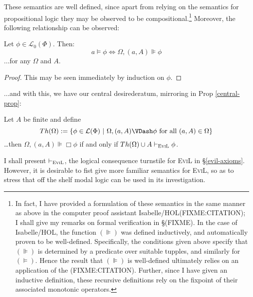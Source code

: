 These semantics are well defined, since apart from relying on the semantics
for propositional logic they may be observed to be compositional.{\footnote{In
fact, I have provided a formulation of these semantics in the same manner as
above in the computer proof assistant Isabelle/HOL(FIXME:CITATION); I shall
give my remarks on formal verification in \S(FIXME).  In the case of
Isabelle/HOL, the function $(\VDash)$ was defined inductively, and
automatically proven to be well-defined.  Specifically, the conditions given
above specify that $(\VDash)$ is determined by a 
predicate over suitable tupples, and similarly for $(\models)$.  Hence the
result that $(\VDash)$ is well-defined ultimately relies on an application of
the  (FIXME:CITATION). Further,
since I have given an inductive definition, these recursive definitions rely
on the {} fixpoint of their associated monotonic operators.}} 
Moreover, the following relationship can be observed:

\begin{lemma}
  Let $\phi \in \mathcal{L}_0 (\Phi)$.  Then:
  \[ a \models \phi \Longleftrightarrow \Omega, (a, A) \VDash \phi \]
  $\ldots$for any $\Omega$ and $A$.
\end{lemma}

\begin{proof}
  This may be seen immediately by induction on $\phi$.
\end{proof}

$\ldots$and with this, we have our central desirederatum, mirroring in Prop \ref{central-prop}:

\begin{proposition}
  Let $A$ be finite and define $$Th(\Omega) := \{ \phi \in \mathcal{L}(\Phi) \ |\ \Omega, (a,A) \VDash \phi \textup{ for all $(a,A) \in \Omega$\}}$$
\ldots then $\Omega, (a,A) \VDash \Box \phi$ if and only if $Th(\Omega) \cup A \vdash_{\text{\textsc{EviL}}} \phi$.
\end{proposition}

I shall present $\vdash_{\text{\textsc{EviL}}}$, the logical consequence turnstile for \textsc{EviL} in \S\ref{evil-axioms}.
  However, it is desirable to fist give more familiar semantics for \textsc{EviL}, so as to stress that off the shelf modal logic can be used in its investigation.